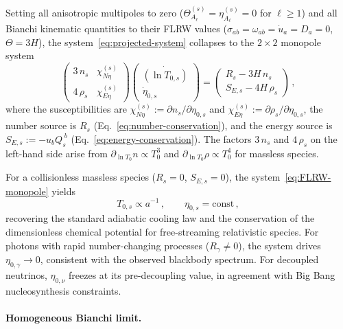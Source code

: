 Setting all anisotropic multipoles to zero
($\Theta^{(s)}_{A_\ell} = \eta^{(s)}_{A_\ell} = 0$
for $\ell \geq 1$) and all Bianchi kinematic
quantities to their FLRW values
($\sigma_{ab} = \omega_{ab} = \dot{u}_a = D_a = 0$,
$\Theta = 3H$), the system~\eqref{eq:projected-system}
collapses to the $2 \times 2$ monopole system
\begin{equation}\label{eq:FLRW-monopole}
\begin{pmatrix}
3\,n_s & \chi^{(s)}_{N\eta} \\[4pt]
4\,\rho_s & \chi^{(s)}_{E\eta}
\end{pmatrix}
\begin{pmatrix}
\dot{(\ln T_{0,s})} \\[4pt]
\dot{\eta}_{0,s}
\end{pmatrix}
=
\begin{pmatrix}
R_s - 3H\, n_s \\[4pt]
S_{E,s} - 4H\, \rho_s
\end{pmatrix}\,,
\end{equation}
where the susceptibilities are
$\chi^{(s)}_{N\eta}
:= \partial n_s / \partial \eta_{0,s}$
and
$\chi^{(s)}_{E\eta}
:= \partial \rho_s / \partial \eta_{0,s}$,
the number source is $R_s$
(Eq.~\ref{eq:number-conservation}), and the energy
source is $S_{E,s} := -u_b Q_s^{\;b}$
(Eq.~\ref{eq:energy-conservation}).  The factors
$3\,n_s$ and $4\,\rho_s$ on the left-hand side arise
from $\partial_{\ln T_0} n \propto T_0^3$ and
$\partial_{\ln T_0} \rho \propto T_0^4$ for massless
species.

For a collisionless massless species ($R_s = 0$,
$S_{E,s} = 0$), the
system~\eqref{eq:FLRW-monopole} yields
\begin{equation}\label{eq:FLRW-solution}
T_{0,s} \propto a^{-1}\,,
\qquad
\eta_{0,s} = \text{const}\,,
\end{equation}
recovering the standard adiabatic cooling law and the
conservation of the dimensionless chemical potential for
free-streaming relativistic species.  For photons with
rapid number-changing processes ($R_\gamma \neq 0$), the
system drives $\eta_{0,\gamma} \to 0$, consistent with
the observed blackbody spectrum.  For decoupled neutrinos,
$\eta_{0,\nu}$ freezes at its pre-decoupling value, in
agreement with Big Bang nucleosynthesis constraints.


\paragraph{Homogeneous Bianchi limit.}

